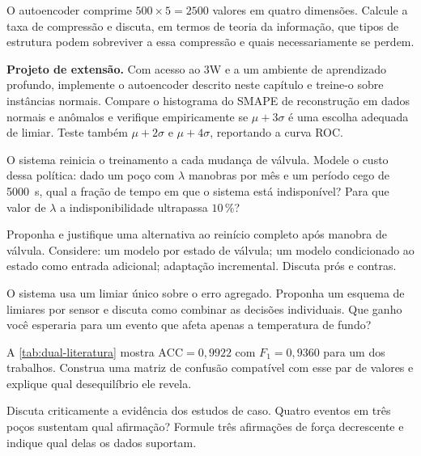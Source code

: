 \begin{exercicios}
\item O autoencoder comprime $500 \times 5 = \num{2500}$ valores em quatro dimensões.
      Calcule a taxa de compressão e discuta, em termos de teoria da informação, que
      tipos de estrutura podem sobreviver a essa compressão e quais necessariamente se
      perdem.

\item \textbf{Projeto de extensão.} Com acesso ao 3W e a um ambiente de aprendizado
      profundo, implemente o autoencoder descrito neste capítulo e treine-o sobre
      instâncias normais. Compare o histograma do SMAPE de reconstrução em dados normais e
      anômalos e verifique empiricamente se $\mu + 3\sigma$ é uma escolha adequada de
      limiar. Teste também $\mu + 2\sigma$ e $\mu + 4\sigma$, reportando a curva ROC.

\item O sistema reinicia o treinamento a cada mudança de válvula. Modele o custo dessa
      política: dado um poço com $\lambda$ manobras por mês e um período cego de
      \SI{5000}{\second}, qual a fração de tempo em que o sistema está indisponível?
      Para que valor de $\lambda$ a indisponibilidade ultrapassa $10\,\%$?

\item Proponha e justifique uma alternativa ao reinício completo após manobra de
      válvula. Considere: um modelo por estado de válvula; um modelo condicionado ao
      estado como entrada adicional; adaptação incremental. Discuta prós e contras.

\item O sistema usa um limiar único sobre o erro agregado. Proponha um esquema de
      limiares por sensor e discuta como combinar as decisões individuais. Que ganho
      você esperaria para um evento que afeta apenas a temperatura de fundo?

\item A \cref{tab:dual-literatura} mostra $\text{ACC} = 0{,}9922$ com $F_1 = 0{,}9360$
      para um dos trabalhos. Construa uma matriz de confusão compatível com esse par de
      valores e explique qual desequilíbrio ele revela.

\item Discuta criticamente a evidência dos estudos de caso. Quatro eventos em três poços
      sustentam qual afirmação? Formule três afirmações de força decrescente e indique
      qual delas os dados suportam.
\end{exercicios}

